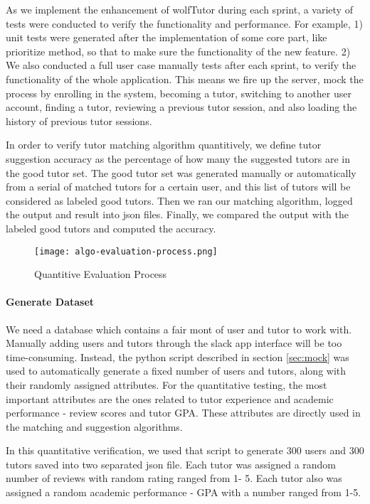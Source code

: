 As we implement the enhancement of wolfTutor during each sprint, 
a variety of tests were conducted to verify the functionality and performance. 
For example, 1) unit tests were generated after the implementation of some 
core part, like prioritize method, so that to make sure the functionality of the 
new feature. 2) We also conducted a full user case manually tests after each 
sprint, to verify the functionality of the whole application. This means we fire 
up the server, mock the process by enrolling in the system,  becoming a tutor, 
switching to another user account, finding a tutor,  reviewing a previous tutor 
session, and also loading the history of previous tutor sessions.

In order to verify tutor matching algorithm quantitively, we define tutor 
suggestion accuracy as the percentage of how many the suggested tutors 
are in the good tutor set. The good tutor set was generated manually or 
automatically from a serial of matched tutors for a certain user, and this list 
of tutors will be considered as labeled good tutors. Then we ran our matching 
algorithm, logged the output and result into json files. Finally, we compared the 
output with the labeled good tutors and computed the accuracy.

\begin{figure}[ht]
  \caption{Quantitive Evaluation Process} 
  \centering
    \label{fig:algo-evluation-process}
    \texttt{[image: algo-evaluation-process.png]}
\end{figure}

\paragraph{Generate Dataset}
We need a database which contains a fair mont of user and tutor to work with. 
Manually adding users and tutors through the slack app interface will be too time-consuming. 
Instead, the python script described in section \ref{sec:mock} was used to automatically generate a fixed number of users and tutors, along with their randomly assigned attributes. For the quantitative testing, the most important attributes are the ones related to tutor experience and academic performance - review scores and tutor GPA. These attributes are directly used in the matching and suggestion algorithms.

In this quantitative verification, we used that script to generate 300 users and 300 tutors saved into two separated json file. Each tutor was assigned a random number of reviews with random rating ranged from 1- 5. Each tutor also was assigned a random academic performance - GPA with a number ranged from 1-5. 

